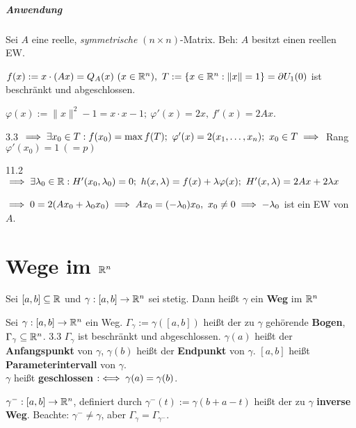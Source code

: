 \documentclass[a4paper,twoside,DIV15,BCOR12mm,chapterprefix=true,headings=twolinechapter]{scrbook}
\begin{document}
\paragraph{Anwendung}
Sei $A$ eine reelle, \emph{symmetrische} $(n\times n)$-Matrix. Beh: $A$ besitzt einen reellen EW.

\begin{beweis}
$f(x) := x\cdot(Ax) = Q_A(x)\ (x \in \mathbb{R}^n),\ T:= \{x \in \mathbb{R}^n: \|x\|=1\} = \partial U_1(0)$ ist beschränkt und abgeschlossen.

$\varphi(x) := \|x\|^2-1 = x\cdot x-1;\ \varphi'(x) = 2x,\ f'(x) = 2Ax$.

3.3 $\implies \exists x_0 \in T: f(x_0) = \max f(T);\ \varphi'(x) = 2(x_1,\ldots,x_n);\ x_0 \in T \implies$ Rang $\varphi'(x_0) = 1\ (=p)$

11.2 $\folgt \exists \lambda_0 \in \MdR: H'(x_0,\lambda_0) = 0;\ h(x,\lambda) = f(x)+\lambda\varphi(x);\ H'(x,\lambda) = 2Ax+2\lambda x$

$\implies 0 = 2(Ax_0+\lambda_0 x_0) \implies Ax_0 = (-\lambda_0) x_0,\ x_0 \ne 0 \implies -\lambda_0$ ist ein EW von $A$.
\end{beweis}
\chapter{Wege im $\mathbb{R}^n$}
 
\begin{definition}
\begin{liste}
\item Sei $[a,b]\subseteq \mathbb{R}$ und $\gamma: [a,b] \to \mathbb{R}^n$ sei stetig. Dann heißt $\gamma$ ein \textbf{Weg} im $\mathbb{R}^n$
\item Sei $\gamma :[a,b] \to \mathbb{R}^n$ ein Weg. $\Gamma_\gamma := \gamma([a,b])$ heißt der zu $\gamma$ gehörende \textbf{Bogen}, $\Gamma_\gamma \subseteq \mathbb{R}^n$. 3.3 \folgt{} $\Gamma_\gamma$ ist beschränkt und abgeschlossen.
$\gamma(a)$ heißt der \textbf{Anfangspunkt} von $\gamma$, $\gamma(b)$ heißt der \textbf{Endpunkt} von $\gamma$. $[a,b]$ heißt \textbf{Parameterintervall} von $\gamma$. \\
$\gamma$ heißt \textbf{geschlossen} $:\iff \gamma(a) = \gamma(b)$.
\item $\gamma^-:[a,b]\to \mathbb{R}^n$, definiert durch $\gamma^-(t):=\gamma(b+a-t)$ heißt der zu $\gamma$ \textbf{inverse Weg}. Beachte: $\gamma^- \ne \gamma$, aber $\Gamma_\gamma = \Gamma_{\gamma^-}$.
\end{liste}
\end{definition}
\end{document}
